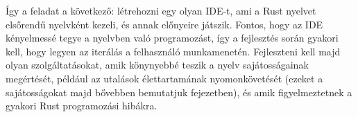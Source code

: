 Így a feladat a következő: létrehozni egy olyan IDE-t, ami a Rust nyelvet elsőrendű nyelvként kezeli, és annak előnyeire játszik. 
Fontos, hogy az IDE kényelmessé tegye a nyelvben való programozást, így a fejlesztés során gyakori kell, hogy legyen az iterálás a felhasználó munkamenetén. 
Fejleszteni kell majd olyan szolgáltatásokat, amik könynyebbé teszik a nyelv sajátosságainak megértését, például az utalások élettartamának nyomonkövetését 
(ezeket a sajátosságokat majd bővebben bemutatjuk  fejezetben), és amik figyelmeztetnek a gyakori Rust programozási hibákra.



